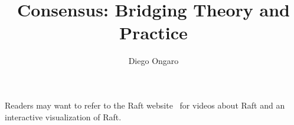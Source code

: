 \documentclass[11pt]{report}
\title{Consensus: Bridging Theory and Practice}
\author{Diego Ongaro}
\theoremstyle{definition}
\begin{document}
\beforepreface




Readers may want to refer to the Raft website~\cite{implementations} for
videos about Raft and an interactive visualization of Raft.


\afterpreface

\let\Chaptermark\chaptermark
\renewcommand\chaptermark[1]{
\def\Chaptername{#1}\Chaptermark{#1}
}

\newcommand{\vcaption}[2][Figure]{
  \caption[\Chaptername: #1]{#2}
}

\makeatletter
\def\sectionmark#1{%
  }
\def\Chaptermark#1{%
  \markboth {\MakeUppercase{%
    \ifnum \c@secnumdepth >\m@ne
        \@chapapp\ \thechapter. \ %
    \fi
    #1}}{\MakeUppercase{%
    \ifnum \c@secnumdepth >\m@ne
        \@chapapp\ \thechapter. \ %
    \fi
    #1}}}%
\let\@mkboth\markboth
\makeatother


\newcommand\cold{$C_\text{old}$}
\newcommand\cnew{$C_\text{new}$}
\newcommand\cboth{$C_\text{old,new}$}















\appendix




\label{end}



\end{document}

